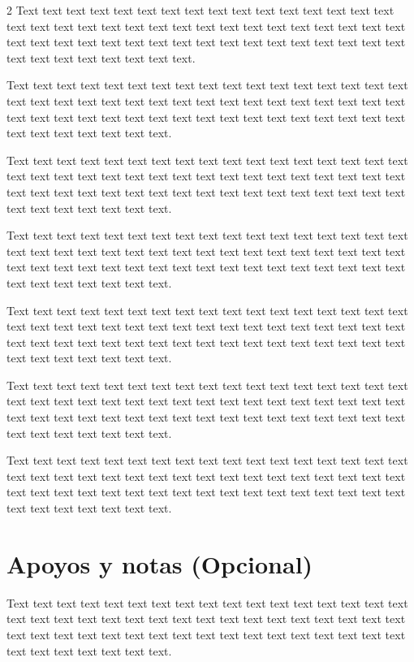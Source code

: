\documentclass[12pt,twoside]{apa7}
\begin{document}
\begin{multicols}{2}
Text text text text text text text text text text text text text text text text text text text text text text text text text text text text text text text text text text text text text text text text text text text text text text text text text text text text text text text text text text.

Text text text text text text text text text text text text text text text text text text text text text text text text text text text text text text text text text text text text text text text text text text text text text text text text text text text text text text text text text text.

Text text text text text text text text text text text text text text text text text text text text text text text text text text text text text text text text text text text text text text text text text text text text text text text text text text text text text text text text text text.

Text text text text text text text text text text text text text text text text text text text text text text text text text text text text text text text text text text text text text text text text text text text text text text text text text text text text text text text text text text.

Text text text text text text text text text text text text text text text text text text text text text text text text text text text text text text text text text text text text text text text text text text text text text text text text text text text text text text text text text text.

Text text text text text text text text text text text text text text text text text text text text text text text text text text text text text text text text text text text text text text text text text text text text text text text text text text text text text text text text text text.

Text text text text text text text text text text text text text text text text text text text text text text text text text text text text text text text text text text text text text text text text text text text text text text text text text text text text text text text text text text.

\section*{Apoyos y notas (Opcional)}
Text text text text text text text text text text text text text text text text text text text text text text text text text text text text text text text text text text text text text text text text text text text text text text text text text text text text text text text text text text.

\printbibliography
\end{multicols}
\end{document}
